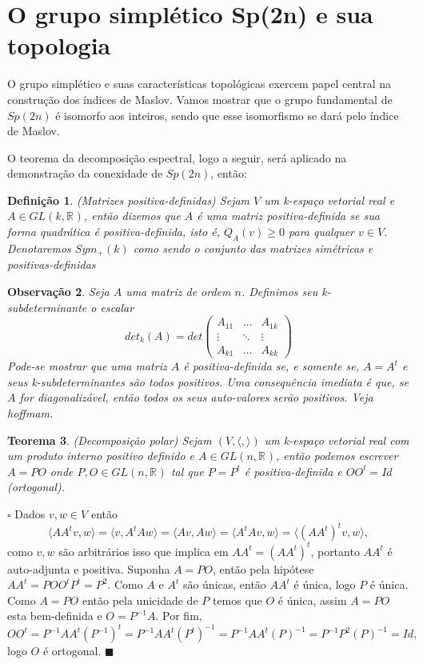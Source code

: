 \documentclass[12pt]{book}
\newtheorem{teorema}{Teorema}[section]
\newtheorem{definicao}[teorema]{Definição}
\newtheorem{observacao}[teorema]{Observação}
\newenvironment{prova}[1]{$\square$ #1}{\hfill$\blacksquare$}
\newcommand{\generalgroup}[2]{GL(#1, #2)}
\newcommand{\generalgroupreal}[1]{\generalgroup{#1}{\real{}}}
\newcommand{\gruposimpletico}[1]{Sp(#1)}
\newcommand{\matrizsimetricapositiva}[1]{Sym_{+}(#1)}
\newcommand{\real}[1]{\mathbb{R}^{#1}}
\newcommand{\innerprod}[2]{\langle #1, #2 \rangle}
\newcommand{\vermelho}[1]{{\color{red}#1}}
\begin{document}
	\section{O grupo simplético 
		\gruposimpletico{2n} e sua topologia}
	O grupo simplético e suas características topológicas exercem papel central na construção dos índices de Maslov. Vamos mostrar que o grupo fundamental de $Sp(2n)$ é isomorfo aos inteiros, sendo que esse isomorfismo se dará pelo índice de Maslov.

	O teorema da decomposição espectral, logo a seguir, será aplicado na demonstração da conexidade de $\gruposimpletico{2n}$, então:
	
	\begin{definicao}\label{definicao_matriz_positiva_definida}
		(Matrizes positiva-definidas) Sejam $V$ um k-espaço vetorial real  e $A \in \generalgroupreal{k}$, então dizemos que $A$ é uma matriz positiva-definida se sua forma quadrática é positiva-definida, isto é, $Q_{A}(v)\ge 0$ para qualquer $v\in V$. Denotaremos $\matrizsimetricapositiva{k}$ como sendo o conjunto das matrizes simétricas e positivas-definidas
	\end{definicao}
	
	\begin{observacao}\label{observacao_matriz_positiva_definida}
		Seja $A$ uma matriz de ordem $n$. Definimos seu k-subdeterminante o escalar
		$$
		det_{k}(A) =
		det \left(
		\begin{array}{ccc}
		A_{11} & \dots & A_{1k}
		\\
		\vdots & \ddots & \vdots
		\\
		A_{k1} & \dots & A_{kk}
		\end{array}
		\right)
		$$
		Pode-se mostrar que uma matriz $A$ é positiva-definida se, e somente se, $A=A^{t}$ e seus k-subdeterminantes são todos positivos. Uma consequência imediata é que, se $A$ for diagonalizável, então todos os seus auto-valores serão positivos. \vermelho{Veja hoffmam}.
	\end{observacao}
	
	\begin{teorema}\label{teorema_decomposicao_polar}
		(Decomposição polar) Sejam $(V, \innerprod{}{})$ um k-espaço vetorial real com um produto interno positivo definido e $A \in \generalgroupreal{n}$, então podemos escrever $A=PO$ onde $P,O\in  \generalgroupreal{n}$ tal que $P = P^{t}$ é positiva-definida e $OO^{t} = Id$ (ortogonal).
	\end{teorema}
	\begin{prova}
		Dados $v,w \in V$ então 
		$$
		\innerprod{AA^{t}v}{w}=\innerprod{v}{A^{t}Aw}=\innerprod{Av}{Aw}=\innerprod{A^{t}Av}{w}=\innerprod{(AA^{t})^{t} v}{w},
		$$
		como $v,w $ são arbitrários isso que implica em $AA^{t}=(AA^{t})^{t}$, portanto $AA^{t}$ é auto-adjunta e positiva. Suponha $A=PO$, então pela hipótese $AA^{t} = POO^{t}P^{t} = P^{2}$. Como $A$ e $A^{t}$ são únicas, então $AA^{t}$ é única, logo $P$ é única. Como $A=PO$ então pela unicidade de $P$ temos que $O$ é única, assim $A=PO$ esta bem-definida e $O=P^{-1}A$. Por fim, 
		$$
		OO^{t} = P^{-1}AA^{t}(P^{-1})^{t}= P^{-1}AA^{t}(P^{t})^{-1}=P^{-1}AA^{t}(P)^{-1}=P^{-1}P^{2}(P)^{-1}=Id,
		$$
		logo $O$ é ortogonal.
	\end{prova}
	
\end{document}
